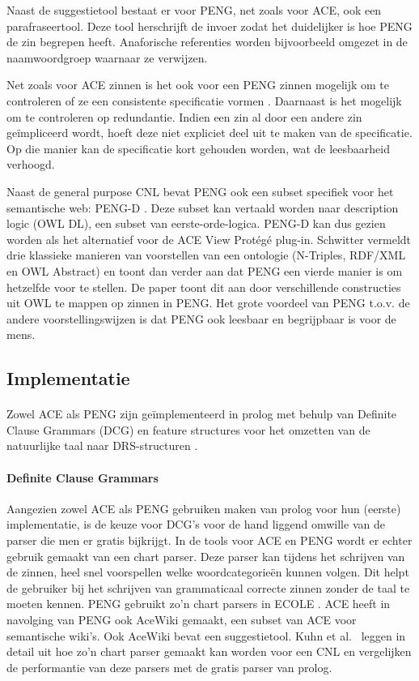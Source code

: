 Naast de suggestietool bestaat er voor PENG, net zoals voor ACE, ook een parafraseertool. Deze tool herschrijft de invoer zodat het duidelijker is hoe PENG de zin begrepen heeft. Anaforische referenties worden bijvoorbeeld omgezet in de naamwoordgroep waarnaar ze verwijzen.

Net zoals voor ACE zinnen is het ook voor een PENG zinnen mogelijk om te controleren of ze een consistente specificatie vormen \cite{Schwitter2004b}. Daarnaast is het mogelijk om te controleren op redundantie. Indien een zin al door een andere zin ge\"impliceerd wordt, hoeft deze niet expliciet deel uit te maken van de specificatie. Op die manier kan de specificatie kort gehouden worden, wat de leesbaarheid verhoogd.

Naast de general purpose CNL bevat PENG ook een subset specifiek voor het semantische web: PENG-D \cite{Schwitter2004}. Deze subset kan vertaald worden naar description logic (OWL DL), een subset van eerste-orde-logica. PENG-D kan dus gezien worden als het alternatief voor de ACE View Prot\'eg\'e plug-in.
Schwitter \cite{Schwitter2006} vermeldt drie klassieke manieren van voorstellen van een ontologie (N-Triples, RDF/XML en OWL Abstract) en toont dan verder aan dat PENG een vierde manier is om hetzelfde voor te stellen. De paper toont dit aan door verschillende constructies uit OWL te mappen op zinnen in PENG. Het grote voordeel van PENG t.o.v. de andere voorstellingswijzen is dat PENG ook leesbaar en begrijpbaar is voor de mens.

\subsection{Implementatie}
\paragraph{} Zowel ACE als PENG zijn ge\"implementeerd in prolog met behulp van Definite Clause Grammars (DCG) en feature structures voor het omzetten van de natuurlijke taal naar DRS-structuren \cite{Fuchs2008, Schwitter2006}.

\paragraph{Definite Clause Grammars} Aangezien zowel ACE als PENG gebruiken maken van prolog voor hun (eerste) implementatie, is de keuze voor DCG's voor de hand liggend omwille van de parser die men er gratis bijkrijgt. In de tools voor ACE en PENG wordt er echter gebruik gemaakt van een chart parser. Deze parser kan tijdens het schrijven van de zinnen, heel snel voorspellen welke woordcategorie\"en kunnen volgen. Dit helpt de gebruiker bij het schrijven van grammaticaal correcte zinnen zonder de taal te moeten kennen. PENG gebruikt zo'n chart parsers in ECOLE \cite{Schwitter2003}. ACE heeft in navolging van PENG ook AceWiki \cite{Kuhn2008} gemaakt, een subset van ACE voor semantische wiki's. Ook AceWiki bevat een suggestietool. Kuhn et al.\ \cite{Kuhn2008} leggen in detail uit hoe zo'n chart parser gemaakt kan worden voor een CNL en vergelijken de performantie van deze parsers met de gratis parser van prolog.

